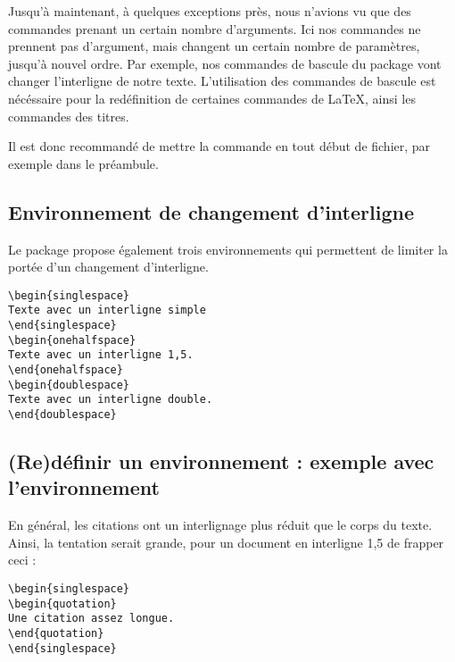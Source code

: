 Jusqu'à maintenant, à quelques exceptions près, nous n'avions vu que des commandes prenant un certain nombre d'arguments. Ici nos commandes ne prennent pas d'argument, mais changent un certain nombre de paramètres, jusqu'à nouvel ordre. Par exemple, nos commandes de bascule du package  vont changer l'interligne de notre texte. L'utilisation des commandes de bascule est nécéssaire pour la redéfinition de certaines commandes de \LaTeX, ainsi les commandes des titres.

Il est donc recommandé de mettre la commande  en tout début de fichier, par exemple dans le préambule.

\subsection{Environnement de changement d'interligne}

Le package  propose également trois environnements qui permettent de limiter la portée d'un changement d'interligne. 

\begin{verbatim}
\begin{singlespace}
Texte avec un interligne simple
\end{singlespace}
\begin{onehalfspace}
Texte avec un interligne 1,5.
\end{onehalfspace}
\begin{doublespace}
Texte avec un interligne double.
\end{doublespace}
\end{verbatim}

\subsection[Rédéfinir un environnement : quotation]{(Re)définir un environnement : exemple avec l'environnement }

En général, les citations ont un interlignage plus réduit que le corps du texte. Ainsi, la tentation serait grande, pour un document en interligne 1,5 de frapper ceci :

\begin{verbatim}
\begin{singlespace}
\begin{quotation}
Une citation assez longue.
\end{quotation}
\end{singlespace}
\end{verbatim}

